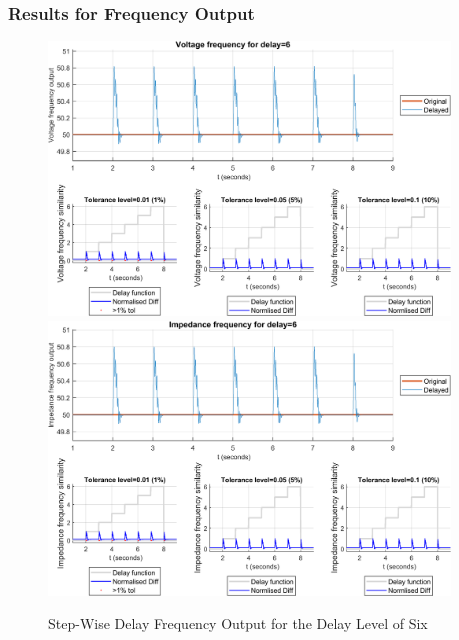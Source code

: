 \subsubsection{Results for Frequency Output}


\begin{figure}
    \caption{Step-Wise Delay Frequency Output for the Delay Level of Six}
    \includegraphics[width=0.95\textwidth]{PMUsim-figures/DelayOf_6/Step_vFrequency.png}    
    \label{fig:PMUsimStep_Six_vFrequency}
    \includegraphics[width=0.95\textwidth]{PMUsim-figures/DelayOf_6/Step_iFrequency.png}    
    \label{fig:PMUsimStep_Six_Frequency}
        \begin{small}
     \end{small}

\end{figure}


